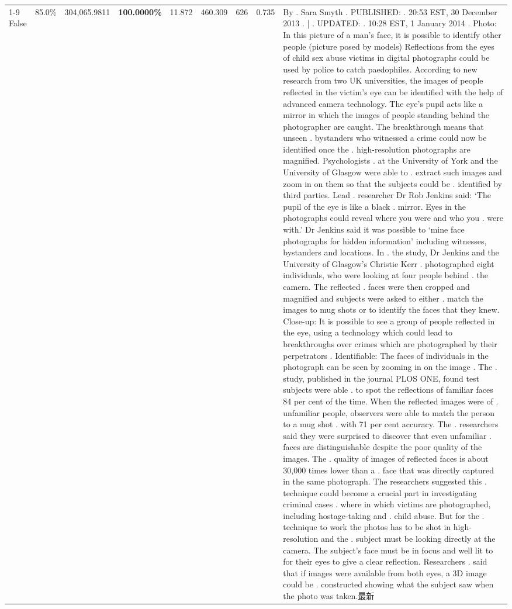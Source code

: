 \begin{table}[H]
\begin{tabular}{lllrlllll}
\cline{1-9}
False & 85.0\% & \color{red} 304,065.9811 & \bfseries \color{red} 100.0000\% & 11.872 & 460.309 & 626 & 0.735 & By . Sara Smyth . PUBLISHED: . 20:53 EST, 30 December 2013 . | . UPDATED: . 10:28 EST, 1 January 2014 . Photo: In this picture of a man's face, it is possible to identify other people (picture posed by models) Reflections from the eyes of child sex abuse victims in digital photographs could be used by police to catch paedophiles. According to new research from two UK universities, the images of people reflected in the victim's eye can be identified with the help of advanced camera technology. The eye's pupil acts like a mirror in which the images of people standing behind the photographer are caught. The breakthrough means that unseen . bystanders who witnessed a crime could now be identified once the . high-resolution photographs are magnified. Psychologists . at the University of York and the University of Glasgow were able to . extract such images and zoom in on them so that the subjects could be . identified by third parties. Lead . researcher Dr Rob Jenkins said: ‘The pupil of the eye is like a black . mirror. Eyes in the photographs could reveal where you were and who you . were with.' Dr Jenkins said it was possible to ‘mine face photographs for hidden information' including witnesses, bystanders and locations. In . the study, Dr Jenkins and the University of Glasgow's Christie Kerr . photographed eight individuals, who were looking at four people behind . the camera. The reflected . faces were then cropped and magnified and subjects were asked to either . match the images to mug shots or to identify the faces that they knew. Close-up: It is possible to see a group of people reflected in the eye, using a technology which could lead to breakthroughs over crimes which are photographed by their perpetrators . Identifiable: The faces of individuals in the photograph can be seen by zooming in on the image . The . study, published in the journal PLOS ONE, found test subjects were able . to spot the reflections of familiar faces 84 per cent of the time. When the reflected images were of . unfamiliar people, observers were able to match the person to a mug shot . with 71 per cent accuracy. The . researchers said they were surprised to discover that even unfamiliar . faces are distinguishable despite the poor quality of the images. The . quality of images of reflected faces is about 30,000 times lower than a . face that was directly captured in the same photograph. The researchers suggested this . technique could become a crucial part in investigating criminal cases . where in which victims are photographed, including hostage-taking and . child abuse. But for the . technique to work the photos has to be shot in high-resolution and the . subject must be looking directly at the camera. The subject's face must be in focus and well lit to for their eyes to give a clear reflection. Researchers . said that if images were available from both eyes, a 3D image could be . constructed showing what the subject saw when the photo was taken.最新 \\

\end{tabular}
\end{table}
